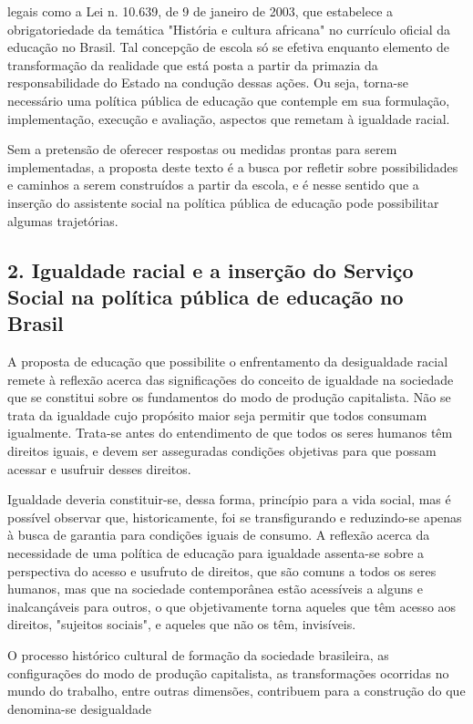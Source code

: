  legais como a Lei n. 10.639, de 9 de janeiro de 2003, que estabelece a
 obrigatoriedade da temática "História e cultura africana" no currículo oficial da
 educação no Brasil. Tal concepção de escola só se efetiva enquanto elemento de
 transformação da realidade que está posta a partir da primazia da responsabilidade do
 Estado na condução dessas ações. Ou seja, torna-se necessário uma política pública de
 educação que contemple em sua formulação, implementação, execução e avaliação,
 aspectos que remetam à igualdade racial.\par Sem a pretensão de oferecer respostas ou medidas prontas para serem implementadas, a
 proposta deste texto é a busca por refletir sobre possibilidades e caminhos a serem
 construídos a partir da escola, e é nesse sentido que a inserção do assistente social
 na política pública de educação pode possibilitar algumas trajetórias.\subsection*{2. Igualdade racial e a inserção do Serviço Social na política pública de
 educação no Brasil}\par A proposta de educação que possibilite o enfrentamento da desigualdade racial remete
 à reflexão acerca das significações do conceito de igualdade na sociedade que se
 constitui sobre os fundamentos do modo de produção capitalista. Não se trata da
 igualdade cujo propósito maior seja permitir que todos consumam igualmente. Trata-se
 antes do entendimento de que todos os seres humanos têm direitos iguais, e devem ser
 asseguradas condições objetivas para que possam acessar e usufruir desses
 direitos.\par Igualdade deveria constituir-se, dessa forma, princípio para a vida social, mas é
 possível observar que, historicamente, foi se transfigurando e reduzindo-se apenas à
 busca de garantia para condições iguais de consumo. A reflexão acerca da necessidade
 de uma política de educação para igualdade assenta-se sobre a perspectiva do acesso e
 usufruto de direitos, que são comuns a todos os seres humanos, mas que na sociedade
 contemporânea estão acessíveis a alguns e inalcançáveis para outros, o que
 objetivamente torna aqueles que têm acesso aos direitos, "sujeitos sociais", e
 aqueles que não os têm, invisíveis.\par O processo histórico cultural de formação da sociedade brasileira, as configurações
 do modo de produção capitalista, as transformações ocorridas no mundo do trabalho,
 entre outras dimensões, contribuem para a construção do que denomina-se desigualdade
